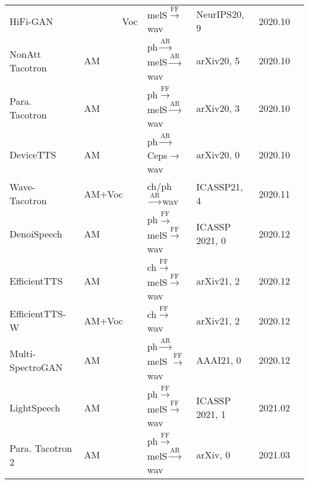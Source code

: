 \documentclass{article}
\begin{document}
\begin{center}
\begin{longtable}{l | l | l | l | l | l }
		HiFi-GAN~\cite{kong2020hifi}               & ~~~~~~~~Voc      & {\color{red}melS}$\stackrel{\text{FF}}{\longrightarrow}$wav   & NeurIPS20, 9 & 2020.10         \\
		NonAtt Tacotron~\cite{shen2020non} & AM       & {\color{blue}ph}$\stackrel{\text{AR}}{\longrightarrow}${\color{red}melS}$\stackrel{\text{AR}}{\longrightarrow}$wav              &arXiv20, 5& 2020.10     &    \\
		Para. Tacotron~\cite{elias2020parallel}      & AM       & {\color{blue}ph}$\stackrel{\text{FF}}{\longrightarrow}${\color{red}melS}$\stackrel{\text{AR}}{\longrightarrow}$wav              &arXiv20, 3& 2020.10   &    \\
		DeviceTTS~\cite{huang2020devicetts}              & AM       &  {\color{blue}ph}$\stackrel{\text{AR}}{\longrightarrow}${\color{red}Ceps}$\rightarrow$wav              &arXiv20, 0& 2020.10 &  \\
		Wave-Tacotron~\cite{weiss2020wave}          & AM+Voc & {\color{blue}ch/ph}$\stackrel{\text{AR}}{\longrightarrow}$wav  &ICASSP21, 4& 2020.11  &   \\
		DenoiSpeech~\cite{zhang2020denoising}            & AM       &{\color{blue}ph}$\stackrel{\text{FF}}{\longrightarrow}${\color{red}melS}$\stackrel{\text{FF}}{\longrightarrow}$wav     & ICASSP 2021, 0 & 2020.12        \\
		EfficientTTS~\cite{miao2020efficienttts}            & AM       &{\color{blue}ch}$\stackrel{\text{FF}}{\longrightarrow}${\color{red}melS}$\stackrel{\text{FF}}{\longrightarrow}$wav     & arXiv21, 2 & 2020.12        \\
		EfficientTTS-W~\cite{miao2020efficienttts}             & AM+Voc       &{\color{blue}ch}$\stackrel{\text{FF}}{\longrightarrow}$wav     & arXiv21, 2 & 2020.12        \\
		Multi-SpectroGAN~\cite{lee2020multi} & AM       &{\color{blue}ph}$\stackrel{\text{AR}}{\longrightarrow}${\color{red}melS} $\stackrel{\text{FF}}{\longrightarrow}$wav     & AAAI21, 0 & 2020.12        \\
		LightSpeech~\cite{luo2021lightspeech}            & AM       &{\color{blue}ph}$\stackrel{\text{FF}}{\longrightarrow}${\color{red}melS}$\stackrel{\text{FF}}{\longrightarrow}$wav     & ICASSP 2021, 1 & 2021.02        \\
		Para. Tacotron 2~\cite{elias2021parallel}    & AM       & {\color{blue}ph}$\stackrel{\text{FF}}{\longrightarrow}${\color{red}melS}$\stackrel{\text{AR}}{\longrightarrow}$wav                 &arXiv, 0& 2021.03         \\

\end{longtable}
\end{center}
\end{document}
